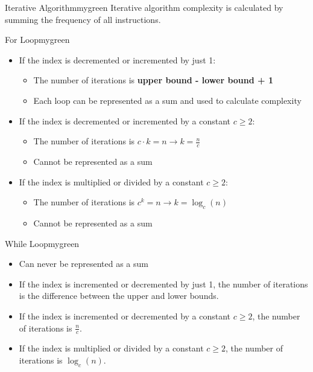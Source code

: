 
\begin{prettyBox}{Iterative Algorithm}{mygreen}
Iterative algorithm complexity is calculated by summing the frequency of all instructions.
\end{prettyBox}

\vspace{0.35cm}

\begin{prettyBox}{For Loop}{mygreen}
\begin{itemize}
    \item If the index is decremented or incremented by just 1:
    \begin{itemize}
        \item The number of iterations is \textbf{upper bound - lower bound + 1}
        \item Each loop can be represented as a sum and used to calculate complexity
    \end{itemize}
    
    \item If the index is decremented or incremented by a constant \( c \geq 2 \):
    \begin{itemize}
        \item The number of iterations is \( c \cdot k = n \rightarrow k = \frac{n}{c} \)
        \item Cannot be represented as a sum
    \end{itemize}
    
    \item If the index is multiplied or divided by a constant \( c \geq 2 \):
    \begin{itemize}
        \item The number of iterations is \( c^k = n \rightarrow k = \log_c(n) \)
        \item Cannot be represented as a sum
    \end{itemize}
\end{itemize}
\end{prettyBox}


\vspace{0.35cm}
\begin{prettyBox}{While Loop}{mygreen}
\begin{itemize}
        \item Can never be represented as a sum
        \item If the index is incremented or decremented by just 1, the number of iterations is the difference between the upper and lower bounds.
        \item If the index is incremented or decremented by a constant \(c \geq 2\), the number of iterations is \( \frac{n}{c} \).
        \item If the index is multiplied or divided by a constant \(c \geq 2\), the number of iterations is \( \log_c(n) \).
\end{itemize}
\end{prettyBox}

